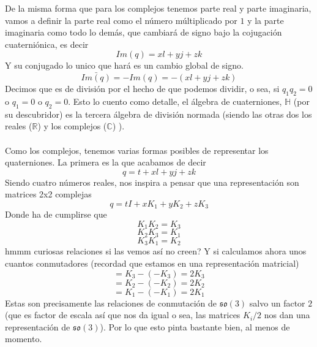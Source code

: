 \documentclass[12pt]{article}
\begin{document}
De la misma forma que para los complejos tenemos parte real y parte imaginaria, vamos a definir la parte real como el número múltiplicado por $1$ y la parte imaginaria como todo lo demás, que cambiará de signo bajo la cojugación cuaterniónica, es decir
$$Im(q)=xl+yj+zk$$
Y su conjugado lo unico que hará es un cambio global de signo. 
$$\bar {Im(q)}=-Im(q)=-(xl+yj+zk)$$
Decimos que es de división por el hecho de que podemos dividir, o sea, si 
$q_1 q_2 =0$ o $q_1=0$ o $q_2=0$. 
Esto lo cuento como detalle, el álgebra de cuaterniones, $\mathbb{H}$ (por su descubridor) es la tercera álgebra de división normada (siendo las otras dos los reales ($\mathbb{R}$) y los complejos ($\mathbb{C}$) ).\\\\
Como los complejos, tenemos varias formas posibles de representar los quaterniones. La primera es la que acabamos de decir 
\begin{equation}
    q=t+xl+yj+zk
\end{equation}
Siendo cuatro números reales, nos inspira a pensar que una representación son matrices 2x2 complejas
\begin{equation}
    q=t I+x K_1+yK_2+zK_3
\end{equation}
Donde ha de cumplirse que
\begin{equation}
K_1 K_2 =K_3
\end{equation}
\begin{equation}
K_2K_3 =K_1
\end{equation}
\begin{equation}
    K_3 K_1 =K_2
\end{equation}
hmmm curiosas relaciones si las vemos así no creen? Y si calculamos ahora unos cuantos conmutadores (recordad que estamos en una representación matricial)
\begin{equation}
    [K_1,K_2]=K_3-(-K_3)=2K_3 
\end{equation}
\begin{equation}
    [K_3,K_1]=K_2-(-K_2)=2K_2
\end{equation}
\begin{equation}
    [K_2,K_3]=K_1-(-K_1)=2K_1
\end{equation}
Estas son precisamente las relaciones de conmutación de $\mathfrak{s}\mathfrak{o}(3)$ salvo un factor $2$ (que es factor de escala así que nos da igual o sea, las matrices $K_i/2$ nos dan una representación de $\mathfrak{s}\mathfrak{o}(3)$). Por lo que esto pinta bastante bien, al menos de momento.\\\\
\end{document}
